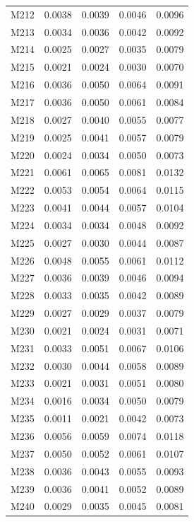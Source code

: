 \begin{longtable}{lrrrr}
M212 & 0.0038 & 0.0039 & 0.0046 & 0.0096 \\
M213 & 0.0034 & 0.0036 & 0.0042 & 0.0092 \\
M214 & 0.0025 & 0.0027 & 0.0035 & 0.0079 \\
M215 & 0.0021 & 0.0024 & 0.0030 & 0.0070 \\
M216 & 0.0036 & 0.0050 & 0.0064 & 0.0091 \\
M217 & 0.0036 & 0.0050 & 0.0061 & 0.0084 \\
M218 & 0.0027 & 0.0040 & 0.0055 & 0.0077 \\
M219 & 0.0025 & 0.0041 & 0.0057 & 0.0079 \\
M220 & 0.0024 & 0.0034 & 0.0050 & 0.0073 \\
M221 & 0.0061 & 0.0065 & 0.0081 & 0.0132 \\
M222 & 0.0053 & 0.0054 & 0.0064 & 0.0115 \\
M223 & 0.0041 & 0.0044 & 0.0057 & 0.0104 \\
M224 & 0.0034 & 0.0034 & 0.0048 & 0.0092 \\
M225 & 0.0027 & 0.0030 & 0.0044 & 0.0087 \\
M226 & 0.0048 & 0.0055 & 0.0061 & 0.0112 \\
M227 & 0.0036 & 0.0039 & 0.0046 & 0.0094 \\
M228 & 0.0033 & 0.0035 & 0.0042 & 0.0089 \\
M229 & 0.0027 & 0.0029 & 0.0037 & 0.0079 \\
M230 & 0.0021 & 0.0024 & 0.0031 & 0.0071 \\
M231 & 0.0033 & 0.0051 & 0.0067 & 0.0106 \\
M232 & 0.0030 & 0.0044 & 0.0058 & 0.0089 \\
M233 & 0.0021 & 0.0031 & 0.0051 & 0.0080 \\
M234 & 0.0016 & 0.0034 & 0.0050 & 0.0079 \\
M235 & 0.0011 & 0.0021 & 0.0042 & 0.0073 \\
M236 & 0.0056 & 0.0059 & 0.0074 & 0.0118 \\
M237 & 0.0050 & 0.0052 & 0.0061 & 0.0107 \\
M238 & 0.0036 & 0.0043 & 0.0055 & 0.0093 \\
M239 & 0.0036 & 0.0041 & 0.0052 & 0.0089 \\
M240 & 0.0029 & 0.0035 & 0.0045 & 0.0081 \\
\end{longtable}
